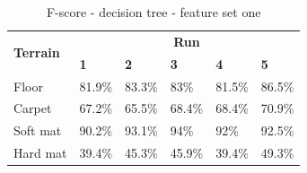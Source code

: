 \documentclass[USenglish]{ifimaster}  %
\begin{document}
\begin{table}[h]\ContinuedFloat
	\begin{subtable}[h]{1\textwidth}
		\centering
		\captionsetup{justification=centering}
		\begin{tabular}{@{}llllll@{}}
		\toprule
		\multirow{2}{*}{\textbf{Terrain}} & \multicolumn{5}{c}{\textbf{Run}} \\ \cmidrule(l){2-6} 
		& \multicolumn{1}{l|}{\textbf{1}} & \multicolumn{1}{l|}{\textbf{2}} & \multicolumn{1}{l|}{\textbf{3}} & \multicolumn{1}{l|}{\textbf{4}} & \textbf{5} \\ \midrule
		\multicolumn{1}{l|}{Floor} & \multicolumn{1}{l|}{81.9\%} & \multicolumn{1}{l|}{83.3\%} & \multicolumn{1}{l|}{83\%} & \multicolumn{1}{l|}{81.5\%} & 86.5\% \\ \midrule
		\multicolumn{1}{l|}{Carpet} & \multicolumn{1}{l|}{67.2\%} & \multicolumn{1}{l|}{65.5\%} & \multicolumn{1}{l|}{68.4\%} & \multicolumn{1}{l|}{68.4\%} & 70.9\% \\ \midrule
		\multicolumn{1}{l|}{Soft mat} & \multicolumn{1}{l|}{90.2\%} & \multicolumn{1}{l|}{93.1\%} & \multicolumn{1}{l|}{94\%} & \multicolumn{1}{l|}{92\%} & 92.5\% \\ \midrule
		\multicolumn{1}{l|}{Hard mat} & \multicolumn{1}{l|}{39.4\%} & \multicolumn{1}{l|}{45.3\%} & \multicolumn{1}{l|}{45.9\%} & \multicolumn{1}{l|}{39.4\%} & 49.3\% \\ \bottomrule
	\end{tabular}
	\caption{F-score - decision tree - feature set one}
	\label{dtfscore}
	\end{subtable}
\end{table}
\end{document}
